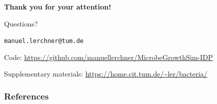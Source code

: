 \documentclass[10pt,t]{beamer}
\begin{document}
\begin{frame}
    \begin{center}
        \vspace{1cm}
        {\LARGE \textbf{Thank you for your attention!}}

        \vspace{1.5cm}

        \Huge{Questions?}

        \vspace{.8cm}

        \small
        \texttt{manuel.lerchner@tum.de}

        \vspace{0.3cm}
        Code: \url{https://github.com/manuellerchner/MicrobeGrowthSim-IDP}

        \vspace{0.2cm}
        Supplementary materials: \url{https://home.cit.tum.de/~ler/bacteria/}
    \end{center}
\end{frame}

\begin{frame}
    \frametitle{References}
    \scriptsize
    
    
\end{frame}

\appendix
\end{document}
